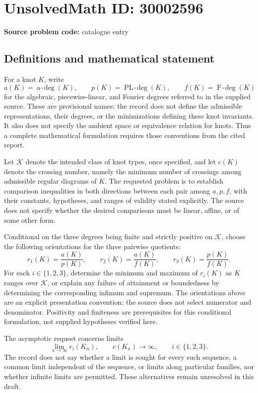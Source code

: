 \documentclass[11pt]{article}
\begin{document}
\section*{UnsolvedMath ID: 30002596}
\textbf{Source problem code:} catalogue entry
\subsection{Definitions and mathematical statement}
For a knot \(K\), write
\[
a(K)=\operatorname{a\!\text{-}\!deg}(K),\qquad p(K)=\operatorname{PL\!\text{-}\!deg}(K),\qquad f(K)=\operatorname{F\!\text{-}\!deg}(K)
\]
for the algebraic, piecewise-linear, and Fourier degrees referred to in the supplied source. These are provisional names: the record does not define the admissible representations, their degrees, or the minimizations defining these knot invariants. It also does not specify the ambient space or equivalence relation for knots. Thus a complete mathematical formulation requires those conventions from the cited report.

Let \(\mathcal K\) denote the intended class of knot types, once specified, and let \(c(K)\) denote the crossing number, namely the minimum number of crossings among admissible regular diagrams of \(K\). The requested problem is to establish comparison inequalities in both directions between each pair among \(a,p,f\), with their constants, hypotheses, and ranges of validity stated explicitly. The source does not specify whether the desired comparisons must be linear, affine, or of some other form.

Conditional on the three degrees being finite and strictly positive on \(\mathcal K\), choose the following orientations for the three pairwise quotients:
\[
r_1(K)=\frac{a(K)}{p(K)},\qquad r_2(K)=\frac{a(K)}{f(K)},\qquad r_3(K)=\frac{p(K)}{f(K)}.
\]
For each \(i\in\{1,2,3\}\), determine the minimum and maximum of \(r_i(K)\) as \(K\) ranges over \(\mathcal K\), or explain any failure of attainment or boundedness by determining the corresponding infimum and supremum. The orientations above are an explicit presentation convention; the source does not select numerator and denominator. Positivity and finiteness are prerequisites for this conditional formulation, not supplied hypotheses verified here.

The asymptotic request concerns limits
\[
\lim_{n\to\infty}r_i(K_n),\qquad c(K_n)\longrightarrow\infty,\qquad i\in\{1,2,3\}.
\]
The record does not say whether a limit is sought for every such sequence, a common limit independent of the sequence, or limits along particular families, nor whether infinite limits are permitted. These alternatives remain unresolved in this draft.
\end{document}
